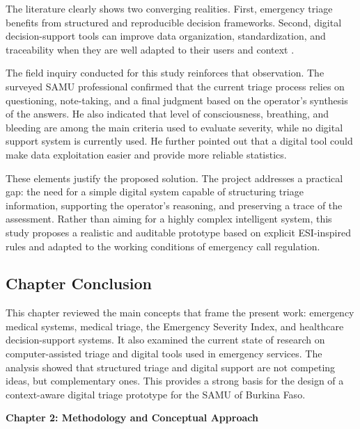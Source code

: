 \documentclass[a4paper,12pt,oneside]{report}
\begin{document}
The literature clearly shows two converging realities. First, emergency triage benefits from structured and reproducible decision frameworks. Second, digital decision-support tools can improve data organization, standardization, and traceability when they are well adapted to their users and context \cite{sutton2020,michel2024,morlotti2024}.

The field inquiry conducted for this study reinforces that observation. The surveyed SAMU professional confirmed that the current triage process relies on questioning, note-taking, and a final judgment based on the operator's synthesis of the answers. He also indicated that level of consciousness, breathing, and bleeding are among the main criteria used to evaluate severity, while no digital support system is currently used. He further pointed out that a digital tool could make data exploitation easier and provide more reliable statistics.

These elements justify the proposed solution. The project addresses a practical gap: the need for a simple digital system capable of structuring triage information, supporting the operator's reasoning, and preserving a trace of the assessment. Rather than aiming for a highly complex intelligent system, this study proposes a realistic and auditable prototype based on explicit ESI-inspired rules and adapted to the working conditions of emergency call regulation.

\subsection*{Chapter Conclusion}

This chapter reviewed the main concepts that frame the present work: emergency medical systems, medical triage, the Emergency Severity Index, and healthcare decision-support systems. It also examined the current state of research on computer-assisted triage and digital tools used in emergency services. The analysis showed that structured triage and digital support are not competing ideas, but complementary ones. This provides a strong basis for the design of a context-aware digital triage prototype for the SAMU of Burkina Faso.

\clearpage

\newpage
\thispagestyle{fancy}
{\LARGE \bfseries \noindent Chapter 2: Methodology and Conceptual Approach}
\vspace{2em}
\renewcommand{\thesection}{\Roman{section}}
\justifying
\end{document}
